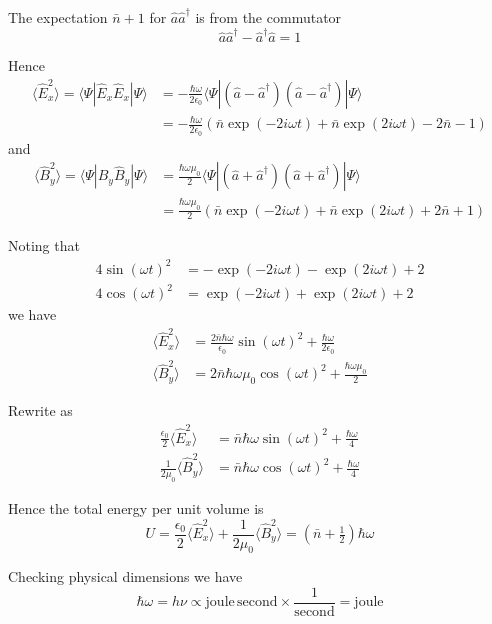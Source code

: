\documentclass[12pt]{article}
\begin{document}
The expectation $\bar n+1$ for $\hat a\hat a^\dag$ is from the commutator
\begin{equation*}
\hat a\hat a^\dag-\hat a^\dag\hat a=1
\end{equation*}

Hence
\begin{align*}
\langle\hat E_x^2\rangle
=\langle\Psi|\hat E_x\hat E_x|\Psi\rangle
&=-\frac{\hbar\omega}{2\epsilon_0}
\langle\Psi|(\hat a-\hat a^\dag)(\hat a-\hat a^\dag)|\Psi\rangle
\\
&=-\frac{\hbar\omega}{2\epsilon_0}
\left(\bar n\exp(-2i\omega t)+\bar n\exp(2i\omega t)-2\bar n-1\right)
\end{align*}
and
\begin{align*}
\langle\hat B_y^2\rangle
=\langle\Psi|\hat B_y\hat B_y|\Psi\rangle
&=\frac{\hbar\omega\mu_0}{2}
\langle\Psi|(\hat a+\hat a^\dag)(\hat a+\hat a^\dag)|\Psi\rangle
\\
&=\frac{\hbar\omega\mu_0}{2}
\left(\bar n\exp(-2i\omega t)+\bar n\exp(2i\omega t)+2\bar n+1\right)
\end{align*}

Noting that
\begin{align*}
4\sin(\omega t)^2&=-\exp(-2i\omega t)-\exp(2i\omega t)+2\\
4\cos(\omega t)^2&=\exp(-2i\omega t)+\exp(2i\omega t)+2
\end{align*}
we have
\begin{align*}
\langle\hat E_x^2\rangle
&=\frac{2\bar n\hbar\omega}{\epsilon_0}\sin(\omega t)^2+\frac{\hbar\omega}{2\epsilon_0}
\\
\langle\hat B_y^2\rangle
&=2\bar n\hbar\omega\mu_0\cos(\omega t)^2+\frac{\hbar\omega\mu_0}{2}
\end{align*}

Rewrite as
\begin{align*}
\frac{\epsilon_0}{2}\langle\hat E_x^2\rangle&=\bar n\hbar\omega\sin(\omega t)^2+\frac{\hbar\omega}{4}
\\
\frac{1}{2\mu_0}\langle\hat B_y^2\rangle&=\bar n\hbar\omega\cos(\omega t)^2+\frac{\hbar\omega}{4}
\end{align*}

Hence the total energy per unit volume is
\begin{equation*}
U=\frac{\epsilon_0}{2}\langle\hat E_x^2\rangle
+\frac{1}{2\mu_0}\langle\hat B_y^2\rangle
=\left(\bar n+\tfrac{1}{2}\right)\hbar\omega
\end{equation*}

Checking physical dimensions we have
\begin{equation*}
\hbar\omega=h\nu\propto\text{joule}\,\text{second}\times\frac{1}{\text{second}}=\text{joule}
\end{equation*}
\end{document}
